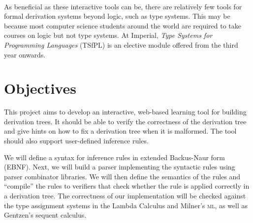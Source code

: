 \mbox{}\\
As beneficial as these interactive tools can be, there are relatively few tools for formal derivation systems beyond logic, such as type systems. This may be because most computer science students around the world are required to take courses on logic but not type systems. At Imperial, \textit{Type Systems for Programming Languages} (TSfPL) is an elective module offered from the third year onwards.

\section{Objectives}
This project aims to develop an interactive, web-based learning tool for building derivation trees. It should be able to verify the correctness of the derivation tree and give hints on how to fix a derivation tree when it is malformed. The tool should also support user-defined inference rules.

We will define a syntax for inference rules in extended Backus-Naur form (EBNF). Next, we will build a parser implementing the syntactic rules using parser combinator libraries. We will then define the semantics of the rules and ``compile'' the rules to verifiers that check whether the rule is applied correctly in a derivation tree. The correctness of our implementation will be checked against the type assignment systems in the Lambda Calculus and Milner's \textsc{ml}, as well as Gentzen's sequent calculus.

